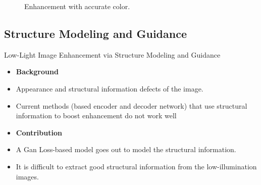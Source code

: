 \documentclass[CJK,aspectratio=169]{beamer}  %
\begin{document}
\begin{frame}
\begin{figure}
			\captionsetup{font=scriptsize}
			\caption{
				\label{fig: color}
				Enhancement with accurate color.
			}
		\end{figure}
		
	\end{frame}
	
	\subsection{Structure Modeling and Guidance}
	
	\begin{frame}
		
		Low-Light Image Enhancement via Structure Modeling and Guidance\textcolor{blue}{\citep{xu2023low}}
		
		\begin{itemize} 
			\item \textbf{Background}
			
			\item[\checkmark] Appearance and structural information defects of the image.
				
			\vspace{.3cm}
			\item[\checkmark] Current methods (based encoder and decoder network) \textcolor{blue}{\citep{rana2021edge}}\textcolor{blue}{\citep{zhu2020eemefn}} that use structural information to boost enhancement do not work well 
			
			
		\end{itemize}
		
		\begin{itemize}
			\item \textbf{Contribution}
			
			\item[\checkmark] A Gan Loss-based model goes out to model the structural information.
			
			\vspace{.3cm}
			\item[\checkmark] It is difficult to extract good structural information from the low-illumination images.
			
		\end{itemize}	
		
	\end{frame}
	
\end{document}
